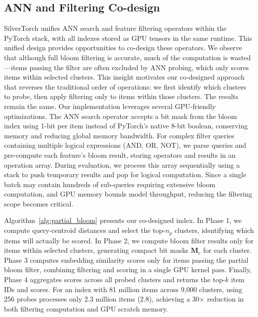 \subsection{ANN and Filtering Co-design}
\label{sec:4.3}
SilverTorch unifies ANN search and feature filtering operators within the PyTorch stack, with all indexes stored as GPU tensors in the same runtime. This unified design provides opportunities to co-design these operators. We observe that although full bloom filtering is accurate, much of the computation is wasted—items passing the filter are often excluded by ANN probing, which only scores items within selected clusters. This insight motivates our co-designed approach that reverses the traditional order of operations: we first identify which clusters to probe, then apply filtering only to items within those clusters. The results remain the same. Our implementation leverages several GPU-friendly optimizations. The ANN search operator accepts a bit mask from the bloom index using 1-bit per item instead of PyTorch's native 8-bit boolean, conserving memory and reducing global memory bandwidth. For complex filter queries containing multiple logical expressions (AND, OR, NOT), we parse queries and pre-compute each feature's bloom result, storing operators and results in an operation array. During evaluation, we process this array sequentially using a stack to push temporary results and pop for logical computation. Since a single batch may contain hundreds of sub-queries requiring extensive bloom computation, and GPU memory bounds model throughput, reducing the filtering scope becomes critical.

Algorithm~\ref{alg:partial_bloom} presents our co-designed index. In Phase 1, we compute query-centroid distances and select the top-$n_p$ clusters, identifying which items will actually be scored. In Phase 2, we compute bloom filter results only for items within selected clusters, generating compact bit masks $\mathbf{M}_c$ for each cluster. Phase 3 computes embedding similarity scores only for items passing the partial bloom filter, combining filtering and scoring in a single GPU kernel pass. Finally, Phase 4 aggregates scores across all probed clusters and returns the top-$k$ item IDs and scores. For an index with 81 million items across 9,000 clusters, using 256 probes processes only 2.3 million items (2.8), achieving a 30$\times$ reduction in both filtering computation and GPU scratch memory.

